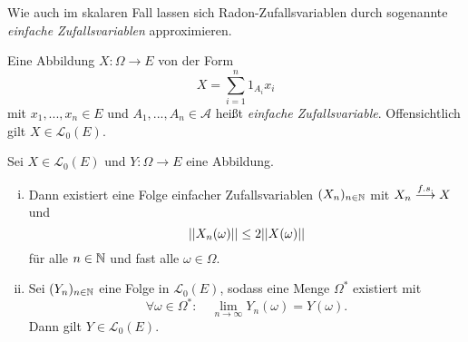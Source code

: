 Wie auch im skalaren Fall lassen sich Radon-Zufallsvariablen durch sogenannte \textit{einfache Zufallsvariablen} approximieren. 

\begin{mydef}
    Eine Abbildung $X:\Omega \to E$ von der Form 
    $$
        X = \sum_{i=1}^n 1_{A_i}x_i
    $$
    mit $x_1,...,x_n \in E$ und $A_1,..., A_n \in \mathcal{A}$ heißt \textit{einfache Zufallsvariable}. Offensichtlich gilt $X \in \mathcal{L}_0(E)$. 
\end{mydef}


\begin{proposition}
    Sei $X \in \mathcal{L}_0(E)$ und $Y: \Omega \to E$ eine Abbildung. 
    \begin{enumerate}[(i)]
        \item Dann existiert eine Folge einfacher Zufallsvariablen $(X_n)_{n \in \mathbb{N}}$ mit $X_n \overset{f.s.}{\longrightarrow} X$ und 
        $$
            \lvert\lvert X_n(\omega) \rvert\rvert \leq 2 \lvert\lvert X(\omega) \rvert\rvert
        $$
        für alle $n \in \mathbb{N}$ und fast alle $\omega \in \Omega$. 
        \item Sei $(Y_n)_{n \in \mathbb{N}}$ eine Folge in $\mathcal{L}_0(E)$, sodass eine Menge $\Omega^*$ existiert mit 
        $$
            \forall \omega \in \Omega^*: \quad \lim_{n \to \infty}Y_n(\omega) = Y(\omega). 
        $$
        Dann gilt $Y \in \mathcal{L}_0(E)$. 
    \end{enumerate}
\end{proposition}

